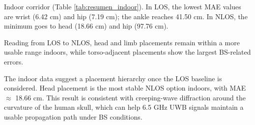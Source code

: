 Indoor corridor (Table \ref{tab:resumen_indoor}). In LOS, the lowest MAE values are wrist (6.42 cm) and hip (7.19 cm); the ankle reaches 41.50 cm. In NLOS, the minimum goes to head (18.66 cm) and hip (97.76 cm).
%
\begin{center}
\label{tab:resumen_indoor}
\end{center}

Reading from LOS to NLOS, head and limb placements remain within a more usable range indoors, while torso-adjacent placements show the largest BS-related errors.

The indoor data suggest a placement hierarchy once the LOS baseline is considered. Head placement is the most stable NLOS option indoors, with MAE $\approx$ 18.66 cm. This result is consistent with creeping-wave diffraction around the curvature of the human skull, which can help 6.5 GHz UWB signals maintain a usable propagation path under BS conditions.

